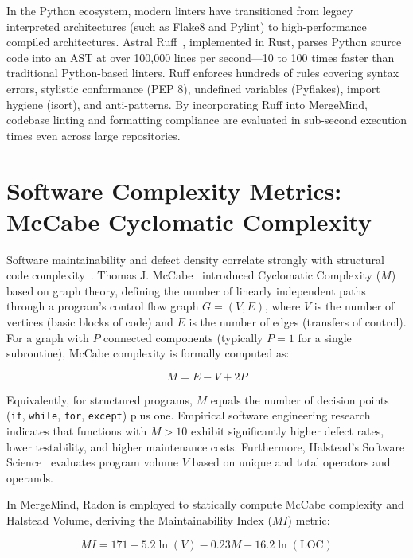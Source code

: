\documentclass[12pt,a4paper,oneside]{report}
\begin{document}
In the Python ecosystem, modern linters have transitioned from legacy interpreted architectures (such as Flake8 and Pylint) to high-performance compiled architectures. Astral Ruff~\cite{astral2024ruff}, implemented in Rust, parses Python source code into an AST at over 100,000 lines per second---10 to 100 times faster than traditional Python-based linters. Ruff enforces hundreds of rules covering syntax errors, stylistic conformance (PEP 8), undefined variables (Pyflakes), import hygiene (isort), and anti-patterns. By incorporating Ruff into MergeMind, codebase linting and formatting compliance are evaluated in sub-second execution times even across large repositories.

\section{Software Complexity Metrics: McCabe Cyclomatic Complexity}
\label{sec:lit-mccabe}

Software maintainability and defect density correlate strongly with structural code complexity~\cite{bernardi2019using}. Thomas J. McCabe~\cite{mccabe1976complexity} introduced Cyclomatic Complexity ($M$) based on graph theory, defining the number of linearly independent paths through a program's control flow graph $G = (V, E)$, where $V$ is the number of vertices (basic blocks of code) and $E$ is the number of edges (transfers of control). For a graph with $P$ connected components (typically $P = 1$ for a single subroutine), McCabe complexity is formally computed as:

\begin{equation}
M = E - V + 2P
\label{eq:mccabe}
\end{equation}

Equivalently, for structured programs, $M$ equals the number of decision points (\texttt{if}, \texttt{while}, \texttt{for}, \texttt{except}) plus one. Empirical software engineering research indicates that functions with $M > 10$ exhibit significantly higher defect rates, lower testability, and higher maintenance costs. Furthermore, Halstead's Software Science~\cite{halstead1977elements} evaluates program volume $V$ based on unique and total operators and operands. 

In MergeMind, Radon is employed to statically compute McCabe complexity and Halstead Volume, deriving the Maintainability Index ($MI$) metric:

\begin{equation}
MI = 171 - 5.2 \ln(V) - 0.23 M - 16.2 \ln(\text{LOC})
\label{eq:maintainability-index}
\end{equation}
\end{document}

